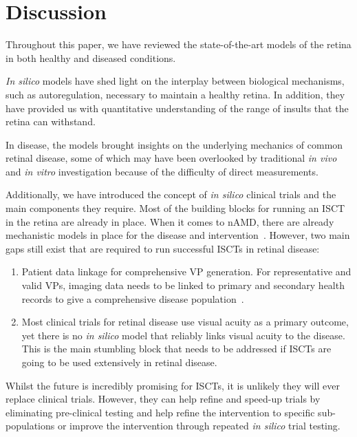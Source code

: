 \documentclass{article}
\begin{document}
\section*{Discussion}

Throughout this paper, we have reviewed the state-of-the-art models of the retina in both healthy and diseased conditions.

\textit{In silico} models have shed light on the interplay between biological mechanisms, such as autoregulation, necessary to maintain a healthy retina.
In addition, they have provided us with quantitative understanding of the range of insults that the retina can withstand.

In disease, the models brought insights on the underlying mechanics of common retinal disease, some of which may have been overlooked by traditional \textit{in vivo} and \textit{in vitro} investigation because of the difficulty of direct measurements.

Additionally, we have introduced the concept of \textit{in silico} clinical trials and the main components they require. 
Most of the building blocks for running an ISCT in the retina are already in place. When it comes to nAMD, there are already mechanistic models in place for the disease and intervention~\cite{Hoyle2017, Vega2021}. However, two main gaps still exist that are required to run successful ISCTs in retinal disease: 

\begin{enumerate}
\item{Patient data linkage for comprehensive VP generation. For representative and valid VPs, imaging data needs to be linked to primary and secondary health records to give a comprehensive disease population~\cite{ElBouri2021}.}

\item{Most clinical trials for retinal disease use visual acuity as a primary outcome, yet there is no \textit{in silico} model that reliably links visual acuity to the disease. This is the main stumbling block that needs to be addressed if ISCTs are going to be used extensively in retinal disease.}
\end{enumerate}

Whilst the future is incredibly promising for ISCTs, it is unlikely they will ever replace clinical trials. However, they can help refine and speed-up trials by eliminating pre-clinical testing and help refine the intervention to specific sub-populations or improve the intervention through repeated \textit{in silico} trial testing.





\end{document}
